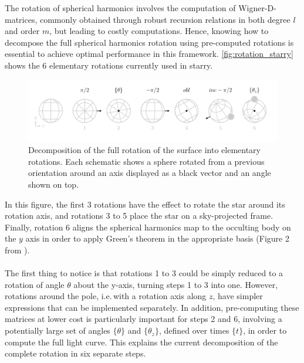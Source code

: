 \documentclass[modern]{aastex631}
\begin{document}
The rotation of spherical harmonics involves the computation of Wigner-D-matrices, commonly obtained through robust recursion relations in both degree $l$ and order $m$, but leading to costly computations. Hence, knowing how to decompose the full spherical harmonics rotation using pre-computed rotations is essential to achieve optimal performance in this framework. \autoref{fig:rotation_starry} shows the 6 elementary rotations currently used in \textsf{starry}.
\begin{figure}[H]
    \begin{center}
        \includegraphics[width=\textwidth]{../workflows/geometry/figures/rotation_starry.pdf}
        \caption{Decomposition of the full rotation of the surface into elementary rotations. Each schematic shows a sphere rotated from a previous orientation around an axis displayed as a black vector and an angle shown on top. }
        \label{fig:rotation_starry}
    \end{center}
\end{figure}
In this figure, the first 3 rotations have the effect to rotate the star around its rotation axis, and rotations 3 to 5 place the star on a sky-projected frame. Finally, rotation 6 aligns the spherical harmonics map to the occulting body on the $y$ axis in order to apply Green's theorem in the appropriate basis (Figure 2 from \citealt{starry}).\\\\
The first thing to notice is that rotations 1 to 3 could be simply reduced to a rotation of angle $\theta$ about the y-axis, turning steps 1 to 3 into one. However, rotations around the pole, i.e.\,with a rotation axis along $z$, have simpler expressions that can be implemented separately. In addition, pre-computing these matrices at lower cost is particularly important for steps 2 and 6, involving a potentially large set of angles $\{\theta\}$ and $\{\theta_z\}$, defined over times $\{t\}$, in order to compute the full light curve. This explains the current decomposition of the complete rotation in six separate steps.\\\\
\end{document}
